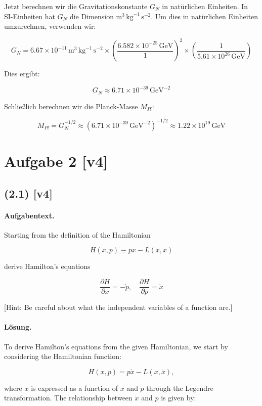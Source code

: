 \documentclass[11pt,a4paper]{article}
\begin{document}
Jetzt berechnen wir die Gravitationskonstante $G_N$ in natürlichen Einheiten. In SI-Einheiten hat $G_N$ die Dimension $\mathrm{m}^3 \, \mathrm{kg}^{-1} \, \mathrm{s}^{-2}$. Um dies in natürlichen Einheiten umzurechnen, verwenden wir:

\[
G_N = 6.67 \times 10^{-11} \, \mathrm{m}^3 \, \mathrm{kg}^{-1} \, \mathrm{s}^{-2} \times \left( \frac{6.582 \times 10^{-25} \, \text{GeV}}{1} \right)^2 \times \left( \frac{1}{5.61 \times 10^{26} \, \text{GeV}} \right)
\]

Dies ergibt:

\[
G_N \approx 6.71 \times 10^{-39} \, \text{GeV}^{-2}
\]

Schließlich berechnen wir die Planck-Masse $M_{Pl}$:

\[
M_{Pl} = G_N^{-1/2} \approx (6.71 \times 10^{-39} \, \text{GeV}^{-2})^{-1/2} \approx 1.22 \times 10^{19} \, \text{GeV}
\]

\section*{Aufgabe 2 [v4]}
\subsection*{(2.1) [v4]}
\paragraph{Aufgabentext.}
Starting from the definition of the Hamiltonian

$$
H(x, p) \equiv p \dot{x}-L(x, \dot{x})
$$

derive Hamilton's equations

$$
\frac{\partial H}{\partial x}=-\dot{p}, \quad \frac{\partial H}{\partial p}=\dot{x}
$$

[Hint: Be careful about what the independent variables of a function are.]

\paragraph{Lösung.}
To derive Hamilton's equations from the given Hamiltonian, we start by considering the Hamiltonian function:

$$
H(x, p) = p \dot{x} - L(x, \dot{x}),
$$

where \( \dot{x} \) is expressed as a function of \( x \) and \( p \) through the Legendre transformation. The relationship between \( \dot{x} \) and \( p \) is given by:
\end{document}
